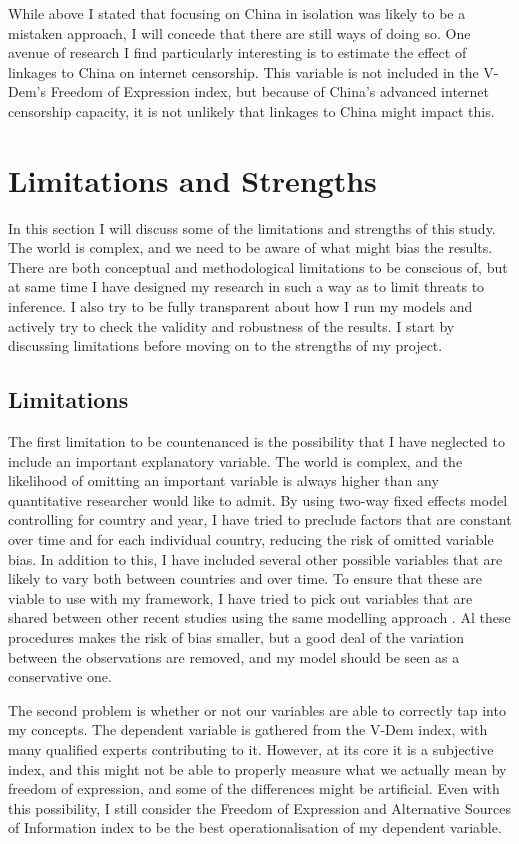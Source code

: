 While above I stated that focusing on China in isolation was likely to be a mistaken approach, I will concede that there are still ways of doing so. One avenue of research I find particularly interesting is to estimate the effect of linkages to China on internet censorship. This variable is not included in the V-Dem's Freedom of Expression index, but because of China's advanced internet censorship capacity, it is not unlikely that linkages to China might impact this.

\section{Limitations and Strengths}
In this section I will discuss some of the limitations and strengths of this study. The world is complex, and we need to be aware of what might bias the results. There are both conceptual and methodological limitations to be conscious of, but at same time I have designed my research in such a way as to limit threats to inference. I also try to be fully transparent about how I run my models and actively try to check the validity and robustness of the results.  I start by discussing limitations before moving on to the strengths of my project.

\subsection{Limitations}
The first limitation to be countenanced is the possibility that I have neglected to include an important explanatory variable. The world is complex, and the likelihood of omitting an important variable is always higher than any quantitative researcher would like to admit. By using two-way fixed effects model controlling for country and year, I have tried to preclude factors that are constant over time and for each individual country, reducing the risk of omitted variable bias. In addition to this, I have included several other possible variables that are likely to vary both between countries and over time. To ensure that these are viable to use with my framework, I have tried to pick out variables that are shared between other recent studies using the same modelling approach \citep{gamso_is_2021, toettoe_foreign_2023}. Al these procedures makes the risk of bias smaller, but a good deal of the variation between the observations are removed, and my model should be seen as a conservative one. 

The second problem is whether or not our variables are able to correctly tap into my concepts. The dependent variable is gathered from the V-Dem index, with many qualified experts contributing to it. However, at its core it is a subjective index, and this might not be able to properly measure what we actually mean by freedom of expression, and some of the differences might be artificial. Even with this possibility, I still consider the Freedom of Expression and Alternative Sources of Information index to be the best operationalisation of my dependent variable.

